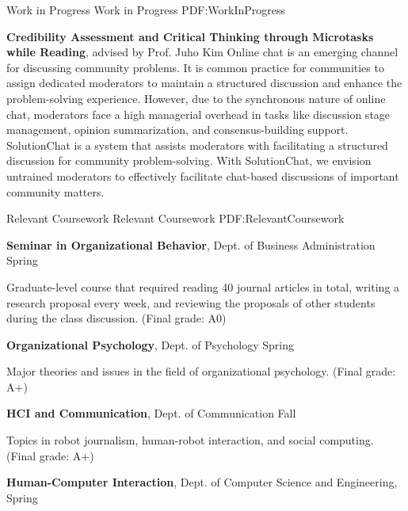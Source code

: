 \documentclass[letterpaper,MMMyyyy,nonstopmode]{template}
\begin{document}
\begin{Body}
\endgroup

\BigGap
\SubSection
{Work in Progress}
{Work in Progress}
{PDF:WorkInProgress}

\begingroup
\renewcommand{\MaxNumberedItem}{[88]}

\BigGap
\NumberedItem{[5]}
\textbf{Credibility Assessment and Critical Thinking through Microtasks while Reading}, advised by Prof. Juho Kim
\vspace{2mm}\newline
{\small{
  Online chat is an emerging channel for discussing community problems. It is common practice for communities to assign dedicated moderators to maintain a structured discussion and enhance the problem-solving experience. However, due to the synchronous nature of online chat, moderators face a high managerial overhead in tasks like discussion stage management, opinion summarization, and consensus-building support. SolutionChat is a system that assists moderators with facilitating a structured discussion for community problem-solving.
  With SolutionChat, we envision untrained moderators to effectively facilitate chat-based discussions of important community matters.
}}

\endgroup


\BigGap
\Section
{Relevant Coursework}
{Relevant Coursework}
{PDF:RelevantCoursework}

\Entry
\textbf{Seminar in Organizational Behavior},
Dept. of Business Administration
\hfill
{} Spring

\Gap
\BulletItem
Graduate-level course that required reading 40 journal articles in total, writing a research proposal every week, and reviewing the proposals of other students during the class discussion. (Final grade: A0)

\BigGap
\Entry
\textbf{Organizational Psychology},
Dept. of Psychology
\hfill
{} Spring

\Gap
\BulletItem
Major theories and issues in the field of organizational psychology. (Final grade: A+)

\BigGap
\Entry
\textbf{HCI and Communication},
Dept. of Communication
\hfill
{} Fall

\Gap
\BulletItem
Topics in robot journalism, human-robot interaction, and social computing. (Final grade: A+)

\BigGap
\Entry
\textbf{Human-Computer Interaction},
Dept. of Computer Science and Engineering,
\hfill
{} Spring


\end{Body}
\end{document}
